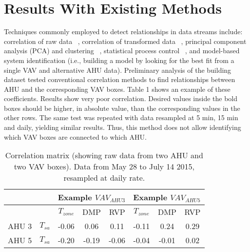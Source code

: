 \section{Results With Existing Methods}

Techniques commonly employed to detect relationships in data streams include: correlation of raw data ~\cite{koc2014comparison}, correlation of transformed data ~\cite{EMD}, principal component analysis (PCA) and clustering ~\cite{narayanaswamy2014data,hong2013towards}, statistical process control ~\cite{wheeler1992understanding}, and model-based system identification (i.e., building a model by looking for the best fit from a single VAV and alternative AHU data). Preliminary analysis of the building dataset tested conventional correlation methods to find relationships between AHU and the corresponding VAV boxes. Table 1 shows an example of these coefficients. Results show very poor correlation. Desired values inside the bold boxes should be higher, in absolute value, than the corresponding values in the other rows. The same test was repeated with data resampled at 5 min, 15 min and daily, yielding similar results. Thus, this method does not allow identifying which VAV boxes are connected to which AHU.

\begin{table}[ht]\scriptsize
 \caption{Correlation matrix (showing raw data from two AHU and two VAV boxes). Data from May 28 to July 14 2015, resampled at daily rate. }
 \label{tab:corr}
\begin{tabular*}{0.40\textwidth}{|c|c|c|c|c|c|c|c|}
\hline
\multicolumn{2}{|c|}{} & 
  \multicolumn{3}{|c|}{Example $VAV_{AHU3}$} & \multicolumn{3}{|c|}{Example $VAV_{AHU5}$} \\ \hline
\multicolumn{2}{|c|}{} & $T_{zone}$ & DMP & RVP &  $T_{zone}$ & DMP & RVP \\ \hline
AHU 3 & $T_{sa}$ & -0.06 & 0.06 & 0.11 & -0.11 & 0.24 & 0.29 \\ \hline
AHU 5  & $T_{sa}$ & -0.20 & -0.19 & -0.06 & -0.04 & -0.01 & 0.02 \\ \hline
\end{tabular*}
\end{table}



